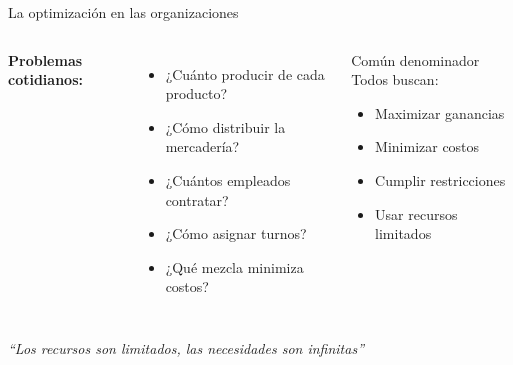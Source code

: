 \documentclass[aspectratio=169,10pt]{beamer}
\begin{document}
\begin{frame}{La optimización en las organizaciones}

\begin{columns}[T]
\textbf{Problemas cotidianos:}
\begin{itemize}
    \item ¿Cuánto producir de cada producto?
    \item ¿Cómo distribuir la mercadería?
    \item ¿Cuántos empleados contratar?
    \item ¿Cómo asignar turnos?
    \item ¿Qué mezcla minimiza costos?
\end{itemize}

\begin{alertblock}{Común denominador}
Todos buscan:
\begin{itemize}
    \item Maximizar ganancias
    \item Minimizar costos
    \item Cumplir restricciones
    \item Usar recursos limitados
\end{itemize}
\end{alertblock}
\end{columns}

\vspace{0.5cm}
\begin{center}
\textit{``Los recursos son limitados, las necesidades son infinitas''}
\end{center}
\end{frame}
\end{document}
